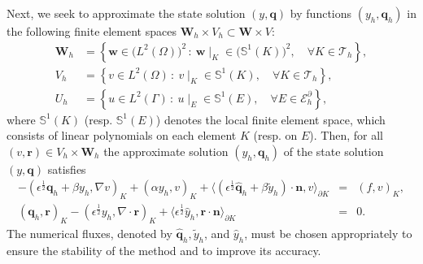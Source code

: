 \documentclass[a4paper,10pt]{article}
\newcommand{\set}[2]{\left\{{#1}\,:~{#2}\right\}}
\newcommand{\hF}{{\frac{1}{2}}}
\newcommand{\cT}{{\mathcal{T}}}
\newcommand{\cE}{{\mathcal{E}}}
\newcommand{\bq}{{\mathbf{q}}}
\newcommand{\br}{{\mathbf{r}}}
\newcommand{\bn}{{\mathbf{n}}}
\newcommand{\bW}{{\mathbf{W}}}
\numberwithin{theorem}{section}
\begin{document}
Next, we seek to approximate the state solution $(y, \bq)$  by functions $(y_h, \bq_h)$ in the following finite element spaces $\bW_h \times V_h \subset \bW \times V$:
\begin{subequations}\label{DG1}
\begin{align}
    \mathbf{W}_h &= \set{\mathbf w \in \big(L^2(\Omega)\big)^2}{ \mathbf w\mid_{K}\in \big( \mathbb{S}^1(K) \big)^2, \quad \forall K \in \cT_h}, \\[4pt]
    V_h &= \set{v \in L^2(\Omega)}{ v \mid_{K}\in \mathbb{S}^1(K), \quad \forall K \in \cT_h}, \\[4pt]
    U_h &= \set{u \in L^2(\Gamma)}{ u \mid_{E}\in \mathbb{S}^1(E), \quad \forall E \in \cE_h^{\partial}},
\end{align}
\end{subequations}
where $\mathbb{S}^1(K)$ (resp. $\mathbb{S}^1(E)$) denotes the local finite element space, which consists of linear polynomials on each element $K$ (resp. on $E$). Then, for all $(v, \br) \in  V_h \times \bW_h$ the approximate solution $(y_h,\bq_h)$ of the state solution $(y,\bq)$ satisfies
\begin{subequations}\label{DG2}
\begin{eqnarray}
-(\epsilon^\hF \bq_h + \beta y_h, \nabla v)_{K} + (\alpha y_h, v)_{K} + \langle ( \epsilon^\hF \widehat{\bq}_h + \beta \widetilde{y}_h ) \cdot \bn, v \rangle_{\partial K} &=& (f,v)_{K}, \\
( \bq_h, \br )_{K} - (\epsilon^\hF y_h, \nabla \cdot  \br)_{K} + \langle \epsilon^\hF \widehat{y}_h,  \br \cdot \bn \rangle_{ \partial K} &=&0.
\end{eqnarray}
\end{subequations}
The numerical fluxes, denoted by $\widehat{\bq}_h, \widetilde{y}_h$, and  $\widehat{y}_h$,  must be chosen appropriately  to ensure the stability of the method and to improve its accuracy.
\end{document}
